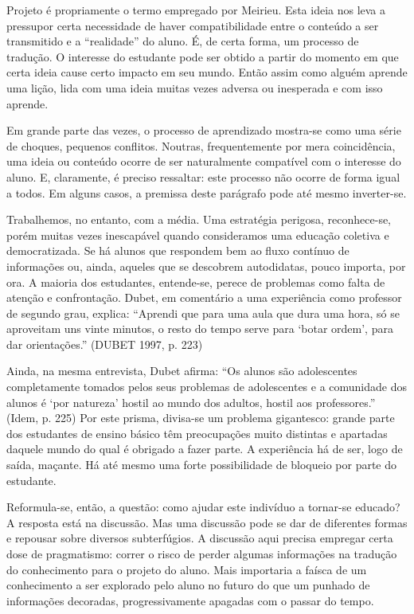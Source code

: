 \documentclass[12pt,a4paper]{article}
\begin{document}
	Projeto é propriamente o termo empregado por Meirieu. Esta ideia nos leva a pressupor certa necessidade de haver compatibilidade entre o conteúdo a ser transmitido e a “realidade” do aluno. É, de certa forma, um processo de tradução. O interesse do estudante pode ser obtido a partir do momento em que certa ideia cause certo impacto em seu mundo. Então assim como alguém aprende uma lição, lida com uma ideia muitas vezes adversa ou inesperada e com isso aprende. 
	
	Em grande parte das vezes, o processo de aprendizado mostra-se como uma série de choques, pequenos conflitos. Noutras, frequentemente por mera coincidência, uma ideia ou conteúdo ocorre de ser naturalmente compatível com o interesse do aluno. E, claramente, é preciso ressaltar: este processo não ocorre de forma igual a todos. Em alguns casos, a premissa deste parágrafo pode até mesmo inverter-se. 
	
	Trabalhemos, no entanto, com a média. Uma estratégia perigosa, reconhece-se, porém muitas vezes inescapável quando consideramos uma educação coletiva e democratizada. Se há alunos que respondem bem ao fluxo contínuo de informações ou, ainda, aqueles que se descobrem autodidatas, pouco importa, por ora. A maioria dos estudantes, entende-se, perece de problemas como falta de atenção e confrontação. Dubet, em comentário a uma experiência como professor de segundo grau, explica: “Aprendi que para uma aula que dura uma hora, só se aproveitam uns vinte minutos, o resto do tempo serve para ‘botar ordem’, para dar orientações.” (DUBET 1997, p. 223)
	
	Ainda, na mesma entrevista, Dubet afirma: “Os alunos são adolescentes completamente tomados pelos seus problemas de adolescentes e a comunidade dos alunos é ‘por natureza’ hostil ao mundo dos adultos, hostil aos professores.” (Idem, p. 225) Por este prisma, divisa-se um problema gigantesco: grande parte dos estudantes de ensino básico têm preocupações muito distintas e apartadas daquele mundo do qual é obrigado a fazer parte. A experiência há de ser, logo de saída, maçante. Há até mesmo uma forte possibilidade de bloqueio por parte do estudante. 
	
	Reformula-se, então, a questão: como ajudar este indivíduo a tornar-se educado? A resposta está na discussão. Mas uma discussão pode se dar de diferentes formas e repousar sobre diversos subterfúgios. A discussão aqui precisa empregar certa dose de pragmatismo: correr o risco de perder algumas informações na tradução do conhecimento para o projeto do aluno. Mais importaria a faísca de um conhecimento a ser explorado pelo aluno no futuro do que um punhado de informações decoradas, progressivamente apagadas com o passar do tempo. 
	
\end{document}
